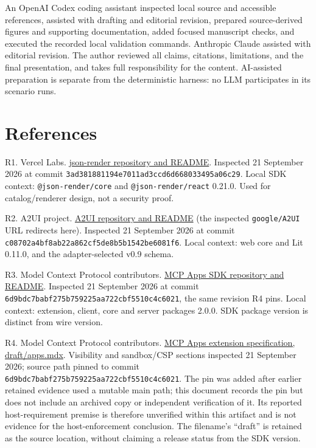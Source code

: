 \documentclass[11pt]{article}
\begin{document}
An OpenAI Codex coding assistant inspected local source and accessible
references, assisted with drafting and editorial revision, prepared
source-derived figures and supporting documentation, added focused
manuscript checks, and executed the recorded local validation commands.
Anthropic Claude assisted with editorial revision. The author reviewed
all claims, citations, limitations, and the final presentation, and
takes full responsibility for the content. AI-assisted preparation is
separate from the deterministic harness: no LLM participates in its
scenario runs.

\section{References}\label{references}

R1. Vercel Labs.
\href{https://github.com/vercel-labs/json-render/tree/3ad381881194e7011ad3ccd6d668033495a06c29}{json-render
repository and README}. Inspected 21 September 2026 at commit
\texttt{3ad381881194e7011ad3ccd6d668033495a06c29}. Local SDK context:
\texttt{@json-render/core} and \texttt{@json-render/react} 0.21.0. Used
for catalog/renderer design, not a security proof.

R2. A2UI project.
\href{https://github.com/a2ui-project/a2ui/tree/c08702a4bf8ab22a862cf5de8b5b1542be6081f6}{A2UI
repository and README} (the inspected \texttt{google/A2UI} URL redirects
here). Inspected 21 September 2026 at commit
\texttt{c08702a4bf8ab22a862cf5de8b5b1542be6081f6}. Local context: web
core and Lit 0.11.0, and the adapter-selected v0.9 schema.

R3. Model Context Protocol contributors.
\href{https://github.com/modelcontextprotocol/ext-apps/tree/6d9bdc7babf275b759225aa722cbf5510c4c6021}{MCP
Apps SDK repository and README}. Inspected 21 September 2026 at commit
\texttt{6d9bdc7babf275b759225aa722cbf5510c4c6021}, the same revision R4
pins. Local context: extension, client, core and server packages 2.0.0.
SDK package version is distinct from wire version.

R4. Model Context Protocol contributors.
\href{https://github.com/modelcontextprotocol/ext-apps/blob/6d9bdc7babf275b759225aa722cbf5510c4c6021/specification/draft/apps.mdx}{MCP
Apps extension specification, draft/apps.mdx}. Visibility and
sandbox/CSP sections inspected 21 September 2026; source path pinned to
commit \texttt{6d9bdc7babf275b759225aa722cbf5510c4c6021}. The pin was
added after earlier retained evidence used a mutable main path; this
document records the pin but does not include an archived copy or
independent verification of it. Its reported host-requirement premise is
therefore unverified within this artifact and is not evidence for the
host-enforcement conclusion. The filename's ``draft'' is retained as the
source location, without claiming a release status from the SDK version.
\end{document}
